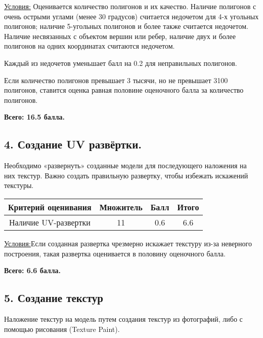 \underline{Условия:} Оценивается количество полигонов и их качество. Наличие полигонов с очень острыми углами (менее 30 градусов) считается недочетом для 4-х угольных полигонов; наличие 5-угольных полигонов и более также считается недочетом. Наличие несвязанных с объектом вершин или ребер, наличие двух и более полигонов на одних координатах считаются недочетом. 

Каждый из недочетов уменьшает балл на 0.2 для неправильных полигонов.

Если количество полигонов превышает 3 тысячи, но не превышает 3100 полигонов, ставится оценка равная половине оценочного балла за количество полигонов.

\textbf{Всего: 16.5 балла.}

\subsection*{4. Создание UV развёртки. }

Необходимо «развернуть» созданные модели для последующего наложения на них текстур. Важно создать правильную развертку, чтобы избежать искажений текстуры.


\begin{table}[H]
    \begin{center}
        \begin{tabular}{|c|c|c|c|}
            \hline
            Критерий оценивания &	Множитель &	Балл &	Итого \\
            \hline
            Наличие UV-развертки &	11 &	0.6	& 6.6 \\       
            \hline
        \end{tabular} 
    \end {center} 
\end{table} 

\underline{Условия:}Если созданная развертка чрезмерно искажает текстуру из-за неверного построения, такая развертка оценивается в половину оценочного балла.

\textbf{Всего: 6.6 балла.}

\subsection*{5. Создание текстур}

Наложение текстур на модель путем создания текстур из фотографий, либо с помощью рисования (Texture Paint).

